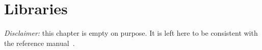 \chapter{Libraries}
\label{chap:lib}

\emph{Disclaimer:} this chapter is empty on purpose. It is left here to be
consistent with the \acsl reference manual~\cite{acsl}.
